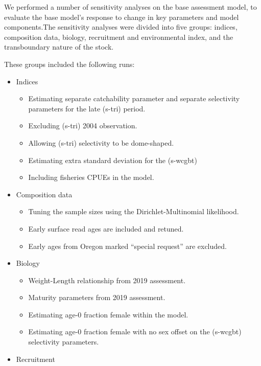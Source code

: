 \documentclass[
]{scrartcl}
\providecommand{\tightlist}{%
  \setlength{\itemsep}{0pt}\setlength{\parskip}{0pt}}\usepackage{longtable,booktabs,array}
\begin{document}
We performed a number of sensitivity analyses on the base assessment
model, to evaluate the base model's response to change in key parameters
and model components.The sensitivity analyses were divided into five
groups: indices, composition data, biology, recruitment and
environmental index, and the transboundary nature of the stock.

These groups included the following runs:

\begin{itemize}
\tightlist
\item
  Indices

  \begin{itemize}
  \tightlist
  \item
    Estimating separate catchability parameter and separate selectivity
    parameters for the late (\textsf{s-tri}) period.
  \item
    Excluding (\textsf{s-tri}) 2004 observation.
  \item
    Allowing (\textsf{s-tri}) selectivity to be dome-shaped.
  \item
    Estimating extra standard deviation for the (\textsf{s-wcgbt})
  \item
    Including fisheries CPUEs in the model.
  \end{itemize}
\item
  Composition data

  \begin{itemize}
  \tightlist
  \item
    Tuning the sample sizes using the Dirichlet-Multinomial likelihood.
  \item
    Early surface read ages are included and retuned.
  \item
    Early ages from Oregon marked ``special request'' are excluded.
  \end{itemize}
\item
  Biology

  \begin{itemize}
  \tightlist
  \item
    Weight-Length relationship from 2019 assessment.
  \item
    Maturity parameters from 2019 assessment.
  \item
    Estimating age-0 fraction female within the model.
  \item
    Estimating age-0 fraction female with no sex offset on the (\textsf{s-wcgbt})
    selectivity parameters.
  \end{itemize}
\item
  Recruitment


\end{itemize}
\end{document}
